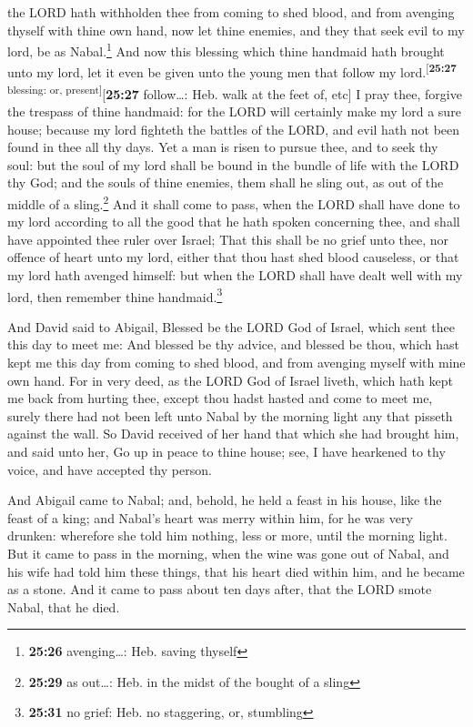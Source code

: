 the LORD hath withholden thee from coming to shed blood, and from
avenging thyself with thine own hand, now let thine enemies, and they
that seek evil to my lord, be as Nabal.\footnote{\textbf{25:26}
  avenging\ldots: Heb. saving thyself}  And now this
blessing which thine handmaid hath brought unto my lord, let it even be
given unto the young men that follow my
lord.\textsuperscript{{[}\textbf{25:27} blessing: or,
present{]}}{[}\textbf{25:27} follow\ldots: Heb. walk at the feet of,
etc{]}  I pray thee, forgive the trespass of thine
handmaid: for the LORD will certainly make my lord a sure house; because
my lord fighteth the battles of the LORD, and evil hath not been found
in thee all thy days.  Yet a man is risen to pursue thee,
and to seek thy soul: but the soul of my lord shall be bound in the
bundle of life with the LORD thy God; and the souls of thine enemies,
them shall he sling out, as out of the middle of a sling.\footnote{\textbf{25:29}
  as out\ldots: Heb. in the midst of the bought of a sling}
 And it shall come to pass, when the LORD shall have done
to my lord according to all the good that he hath spoken concerning
thee, and shall have appointed thee ruler over Israel; 
That this shall be no grief unto thee, nor offence of heart unto my
lord, either that thou hast shed blood causeless, or that my lord hath
avenged himself: but when the LORD shall have dealt well with my lord,
then remember thine handmaid.\footnote{\textbf{25:31} no grief: Heb. no
  staggering, or, stumbling}

 And David said to Abigail, Blessed be the LORD God of
Israel, which sent thee this day to meet me:  And blessed
be thy advice, and blessed be thou, which hast kept me this day from
coming to shed blood, and from avenging myself with mine own hand.
 For in very deed, as the LORD God of Israel liveth,
which hath kept me back from hurting thee, except thou hadst hasted and
come to meet me, surely there had not been left unto Nabal by the
morning light any that pisseth against the wall.  So
David received of her hand that which she had brought him, and said unto
her, Go up in peace to thine house; see, I have hearkened to thy voice,
and have accepted thy person.

 And Abigail came to Nabal; and, behold, he held a feast
in his house, like the feast of a king; and Nabal's heart was merry
within him, for he was very drunken: wherefore she told him nothing,
less or more, until the morning light.  But it came to
pass in the morning, when the wine was gone out of Nabal, and his wife
had told him these things, that his heart died within him, and he became
as a stone.  And it came to pass about ten days after,
that the LORD smote Nabal, that he died.

